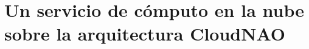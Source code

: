 \documentclass[letterpaper,12pt,spanish]{report}
\begin{document}

\chapter{Un servicio de cómputo en la nube sobre la arquitectura CloudNAO}
\label{\detokenize{chapter_three:un-servicio-de-computo-en-la-nube-sobre-la-arquitectura-cloudnao}}
\label{\detokenize{chapter_three::doc}}









\nocite{*}


\end{document}
